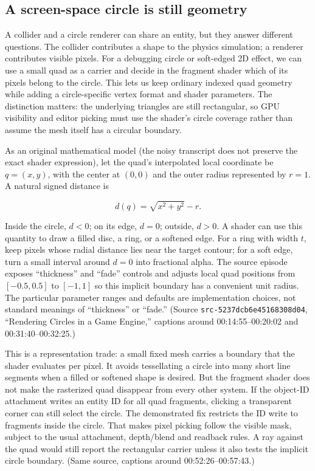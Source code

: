 \hypertarget{06-engine-ii-ch040-grow-behaviour-and-presentation-without-losing-ownership}{}

\subsection{A screen-space circle is still geometry}\label{06-engine-ii-ch040-a-screen-space-circle-is-still-geometry}

\hypertarget{06-engine-ii-ch040-a-screen-space-circle-is-still-geometry}{}

A collider and a circle renderer can share an entity, but they answer different questions. The collider contributes a shape to the physics simulation; a renderer contributes visible pixels. For a debugging circle or soft-edged 2D effect, we can use a small quad as a carrier and decide in the fragment shader which of its pixels belong to the circle. This lets us keep ordinary indexed quad geometry while adding a circle-specific vertex format and shader parameters. The distinction matters: the underlying triangles are still rectangular, so GPU visibility and editor picking must use the shader's circle coverage rather than assume the mesh itself has a circular boundary.

As an original mathematical model (the noisy transcript does not preserve the exact shader expression), let the quad's interpolated local coordinate be \(q=(x,y)\), with the center at \((0,0)\) and the outer radius represented by \(r=1\). A natural signed distance is

\[
d(q)=\sqrt{x^2+y^2}-r.
\]

Inside the circle, \(d<0\); on its edge, \(d=0\); outside, \(d>0\). A shader can use this quantity to draw a filled disc, a ring, or a softened edge. For a ring with width \(t\), keep pixels whose radial distance lies near the target contour; for a soft edge, turn a small interval around \(d=0\) into fractional alpha. The source episode exposes ``thickness'' and ``fade'' controls and adjusts local quad positions from \([-0.5,0.5]\) to \([-1,1]\) so this implicit boundary has a convenient unit radius. The particular parameter ranges and defaults are implementation choices, not standard meanings of ``thickness'' or ``fade.'' (Source \texttt{src-5237dcb6e45168308d04}, ``Rendering Circles in a Game Engine,'' captions around 00:14:55--00:20:02 and 00:31:40--00:32:25.)

This is a representation trade: a small fixed mesh carries a boundary that the shader evaluates per pixel. It avoids tessellating a circle into many short line segments when a filled or softened shape is desired. But the fragment shader does not make the rasterized quad disappear from every other system. If the object-ID attachment writes an entity ID for all quad fragments, clicking a transparent corner can still select the circle. The demonstrated fix restricts the ID write to fragments inside the circle. That makes pixel picking follow the visible mask, subject to the usual attachment, depth/blend and readback rules. A ray against the quad would still report the rectangular carrier unless it also tests the implicit circle boundary. (Same source, captions around 00:52:26--00:57:43.)

